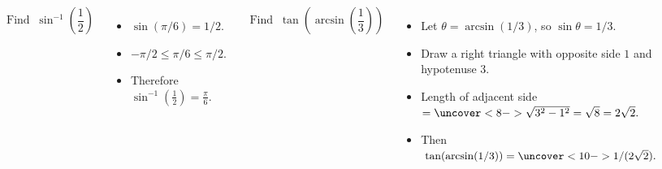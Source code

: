 \begin{frame}
\begin{example}[Example 1, p. 217]
\begin{columns}[t]
\[
\text{Find } \ \sin^{-1} \left( \frac{1}{2}\right) 
\]
\begin{itemize}
\item<2->  $\sin (\pi / 6) = 1/2$.
\item<3->  $-\pi /2 \leq \pi / 6 \leq \pi /2$.
\item<4->  Therefore $\sin^{-1} \left( \frac{1}{2}\right) = \frac{\pi}{6}$.
\end{itemize}
\[
\text{Find } \ \tan \left( \arcsin \left( \frac{1}{3}\right) \right)
\]
\begin{itemize}
\item<5->  Let $\theta = \arcsin (1/3)$, so $\sin \theta = 1/3$.
\item<6->  Draw a right triangle with opposite side $1$ and hypotenuse $3$.
\item<7->  \alert<handout:0| 7-8>{Length of adjacent side $ = \uncover<8->{\sqrt{3^2-1^2} = \sqrt{8} = 2\sqrt{2}.}$}
\item<9->  Then \alert<handout:0| 9-10>{$\tan (\arcsin (1/3)) = \uncover<10->{1/(2\sqrt{2}).}$}
\end{itemize}
\ %
%
%
\end{columns}
\end{example}
\end{frame}
